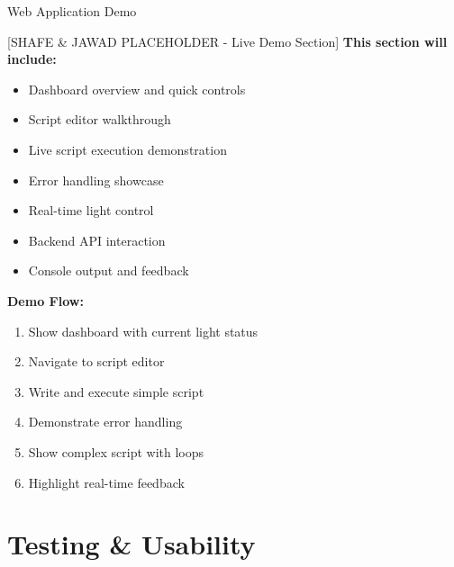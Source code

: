 \documentclass{beamer}
\begin{document}
\begin{frame}{Web Application Demo}
\begin{block}{[SHAFE & JAWAD PLACEHOLDER - Live Demo Section]}
\textbf{This section will include:}
\begin{itemize}
    \item Dashboard overview and quick controls
    \item Script editor walkthrough  
    \item Live script execution demonstration
    \item Error handling showcase
    \item Real-time light control
    \item Backend API interaction
    \item Console output and feedback
\end{itemize}

\textbf{Demo Flow:}
\begin{enumerate}
    \item Show dashboard with current light status
    \item Navigate to script editor
    \item Write and execute simple script
    \item Demonstrate error handling
    \item Show complex script with loops
    \item Highlight real-time feedback
\end{enumerate}
\end{block}
\end{frame}


\section{Testing \& Usability}
\end{document}
